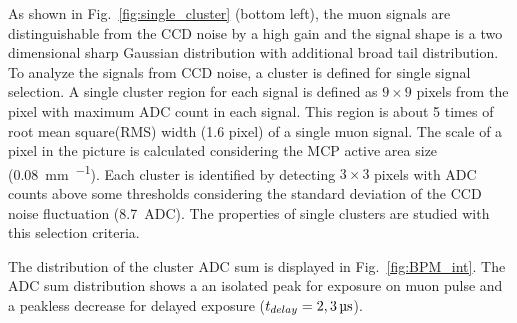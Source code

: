 \documentclass[preprint,3p,twocolumn]{elsarticle}
\begin{document}
As shown in Fig.~\ref{fig:single_cluster} (bottom left), the muon signals are distinguishable from the CCD noise by a high gain and the signal shape is a two dimensional sharp Gaussian distribution with additional broad tail distribution. 
To analyze the signals from CCD noise, a cluster is defined for single signal selection. A single cluster region for each signal is defined as $9 \times 9$ pixels from the pixel with maximum ADC count in each signal. This region is about 5 times of root mean square(RMS) width (1.6 pixel) of a single muon signal. The scale of a pixel in the picture is calculated considering the MCP active area size (\SI{0.08}{\mm \per \pixel}).
Each cluster is identified by detecting $3 \times 3$ pixels with ADC counts above some thresholds considering the standard deviation of the CCD noise fluctuation (\SI{8.7}{ADC}). The properties of single clusters are studied with this selection criteria.

The distribution of the cluster ADC sum is displayed in Fig.~\ref{fig:BPM_int}.
The ADC sum distribution shows a an isolated peak for exposure on muon pulse and a peakless decrease for delayed exposure
($t_{delay} = \SIlist[list-pair-separator = {, }, list-units = single]{2; 3}{\micro\s}$).
\end{document}
